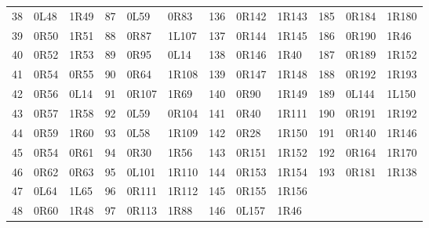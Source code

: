 \begin{longtable}{rll@{\hspace{1.3em}}rll@{\hspace{1.3em}}rll@{\hspace{1.3em}}rll}
38 & 0L48 & 1R49 & 87 & 0L59 & 0R83 & 136 & 0R142 & 1R143 & 185 & 0R184 & 1R180\\
39 & 0R50 & 1R51 & 88 & 0R87 & 1L107 & 137 & 0R144 & 1R145 & 186 & 0R190 & 1R46\\
40 & 0R52 & 1R53 & 89 & 0R95 & 0L14 & 138 & 0R146 & 1R40 & 187 & 0R189 & 1R152\\
41 & 0R54 & 0R55 & 90 & 0R64 & 1R108 & 139 & 0R147 & 1R148 & 188 & 0R192 & 1R193\\
42 & 0R56 & 0L14 & 91 & 0R107 & 1R69 & 140 & 0R90 & 1R149 & 189 & 0L144 & 1L150\\
43 & 0R57 & 1R58 & 92 & 0L59 & 0R104 & 141 & 0R40 & 1R111 & 190 & 0R191 & 1R192\\
44 & 0R59 & 1R60 & 93 & 0L58 & 1R109 & 142 & 0R28 & 1R150 & 191 & 0R140 & 1R146\\
45 & 0R54 & 0R61 & 94 & 0R30 & 1R56 & 143 & 0R151 & 1R152 & 192 & 0R164 & 1R170\\
46 & 0R62 & 0R63 & 95 & 0L101 & 1R110 & 144 & 0R153 & 1R154 & 193 & 0R181 & 1R138\\
47 & 0L64 & 1L65 & 96 & 0R111 & 1R112 & 145 & 0R155 & 1R156 &  &  & \\
48 & 0R60 & 1R48 & 97 & 0R113 & 1R88 & 146 & 0L157 & 1R46 &  &  & \\
\end{longtable}
\endgroup
